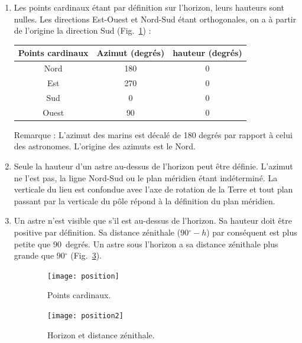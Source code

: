 \documentclass[a4paper,10pt]{report}
\renewcommand{\deg}{\ensuremath{^{\circ}}}
\begin{document}
\begin{Answer}
  \begin{enumerate}
  \item Les points cardinaux étant par définition sur l'horizon, leurs
    hauteurs sont nulles. Les directions Est-Ouest et Nord-Sud étant
    orthogonales, on a à partir de l'origine la direction Sud
    (Fig.~\ref{position}) :
    \begin{center}
      \begin{tabular}{|c|c|c|}
        \hline
        Points cardinaux & Azimut (degrés) & hauteur (degrés) \\ \hline
        Nord  & 180 & 0 \\ \hline
        Est   & 270 & 0 \\ \hline
        Sud   & 0   & 0 \\ \hline
        Ouest & 90  & 0 \\ \hline
      \end{tabular}
    \end{center}
    Remarque : L'azimut des marins est décalé de 180 degrés par rapport
    à celui des astronomes. L'origine des azimuts est le Nord.

  \item Seule la hauteur d'un astre au-dessus de l'horizon peut être
    définie. L'azimut ne l'est pas, la ligne Nord-Sud ou le plan
    méridien étant indéterminé. La verticale du lieu est confondue
    avec l'axe de rotation de la Terre et tout plan passant par la
    verticale du pôle répond à la définition du plan méridien.

  \item Un astre n'est visible que s'il est au-dessus de l'horizon. Sa
    hauteur doit être positive par définition. Sa distance zénithale
    ($90\deg - h$) par conséquent est plus petite que 90~degrés.  Un
    astre sous l'horizon a sa distance zénithale plus grande que
    $90\deg$ (Fig.~\ref{position2}).
  \end{enumerate}

  \begin{figure}
    \centering
    \begin{subfigure}[b]{0.4\textwidth}
      \centering
      \texttt{[image: position]}
      \caption{Points cardinaux.}
      \label{position}
    \end{subfigure}
    \begin{subfigure}[b]{0.4\textwidth}
      \centering
      \texttt{[image: position2]}
      \caption{Horizon et distance zénithale.}
      \label{position2}
    \end{subfigure}
    \caption{}
  \end{figure}
\end{Answer}
\end{document}
